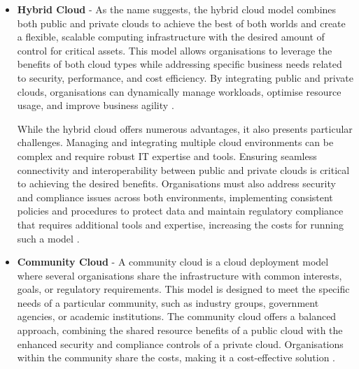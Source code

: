 \begin{itemize}
    \item  \textbf{Hybrid Cloud} - As the name suggests, the hybrid cloud model combines both public and private clouds to achieve the best of both worlds and create a flexible, scalable computing infrastructure with the desired amount of control for critical assets. This model allows organisations to leverage the benefits of both cloud types while addressing specific business needs related to security, performance, and cost efficiency. By integrating public and private clouds, organisations can dynamically manage workloads, optimise resource usage, and improve business agility \citep{cloudmodel}.

    While the hybrid cloud offers numerous advantages, it also presents particular challenges. Managing and integrating multiple cloud environments can be complex and require robust IT expertise and tools. Ensuring seamless connectivity and interoperability between public and private clouds is critical to achieving the desired benefits. Organisations must also address security and compliance issues across both environments, implementing consistent policies and procedures to protect data and maintain regulatory compliance that requires additional tools and expertise, increasing the costs for running such a model \citep{hybrid_model}.
   
    \item  \textbf{Community Cloud} - A community cloud is a cloud deployment model where several organisations share the infrastructure with common interests, goals, or regulatory requirements. This model is designed to meet the specific needs of a particular community, such as industry groups, government agencies, or academic institutions. The community cloud offers a balanced approach, combining the shared resource benefits of a public cloud with the enhanced security and compliance controls of a private cloud. Organisations within the community share the costs, making it a cost-effective solution \citep{cloudmodel}.
\end{itemize}

